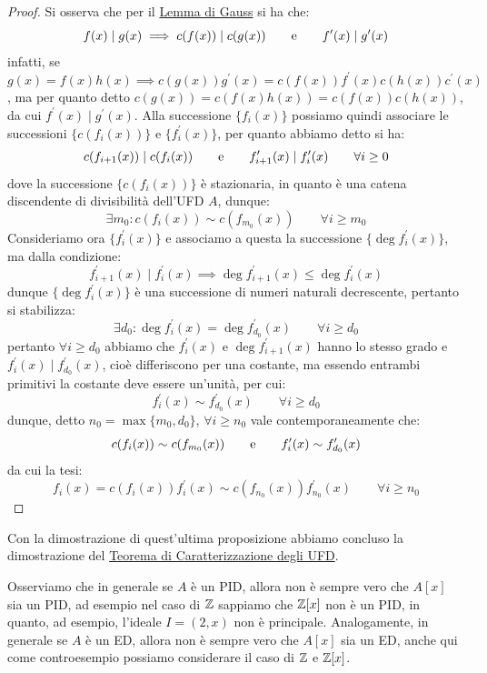 \documentclass[11pt]{scrartcl}
\begin{document}
\begin{proof}
    Si osserva che per il \hyperref[gauss]{Lemma di Gauss} si ha che:
    \[ f(x) \mid g(x) \implies c(f(x)) \mid c(g(x)) \qquad \text e \qquad f^{\prime}(x) \mid g^{\prime}(x)
        \]
    infatti, se $g(x) = f(x) h(x) \implies c(g(x))g^{\prime}(x) = c(f(x))f^{\prime}(x)c(h(x))c^{\prime}(x)$,
    ma per quanto detto $c(g(x)) = c(f(x)h(x)) = c(f(x))c(h(x))$, da cui $f^{\prime}(x) \mid g^{\prime}(x)$.
    Alla successione $\{f_i(x)\}$ possiamo quindi associare le successioni $\{c(f_i(x))\}$ e $\{f_i^{\prime}(x)\}$, per quanto abbiamo detto si ha:
    \[ c(f_{i+1}(x)) \mid c(f_{i}(x)) \qquad \text e \qquad f_{i+1}^{\prime}(x) \mid f_i^{\prime}(x) \qquad \forall i \geq 0
        \]
    dove la successione $\{c(f_i(x))\}$ è stazionaria, in quanto è una catena discendente di divisibilità dell'UFD $A$, dunque:
    \[ \exists m_0 : c(f_i(x)) \sim c(f_{m_0}(x)) \qquad \forall i \geq m_0
        \]
    Consideriamo ora $\{f_i^{\prime}(x)\}$ e associamo a questa la successione $\{\deg f_i^{\prime}(x)\}$, ma dalla condizione:
    \[ f_{i+1}^{\prime}(x) \mid f_i^{\prime}(x) \implies \deg f_{i+1}^{\prime}(x) \leq \deg f_i^{\prime}(x)
        \]
    dunque $\{\deg f_i^{\prime}(x)\}$ è una successione di numeri naturali decrescente, pertanto si stabilizza:
    \[ \exists d_0 : \deg f_{i}^{\prime}(x) = \deg f_{d_0}^{\prime}(x) \qquad \forall i \geq d_0
        \]
    pertanto $\forall i \geq d_0$ abbiamo che $f_i^{\prime}(x)$ e $\deg f_{i+1}^{\prime}(x)$ hanno lo stesso grado e $f_{i}^{\prime}(x) \mid f_{d_0}^{\prime}(x)$,
    cioè differiscono per una costante, ma essendo entrambi primitivi la costante deve essere un'unità, per cui:
    \[ f_{i}^{\prime}(x) \sim f_{d_0}^{\prime}(x) \qquad \forall i \geq d_0
        \]
    dunque, detto $n_0 = \max\{m_0,d_0\}$, $\forall i \geq n_0$ vale contemporaneamente che:
    \[ c(f_i(x)) \sim c(f_{m_0}(x)) \qquad \text e \qquad f_{i}^{\prime}(x) \sim f_{d_0}^{\prime}(x)
        \]
    da cui la tesi:
    \[ f_i(x) = c(f_i(x))f_{i}^{\prime}(x) \sim c(f_{n_0}(x))f_{n_0}^{\prime}(x) \qquad \forall i \geq n_0
        \]
\end{proof}

Con la dimostrazione di quest'ultima proposizione abbiamo concluso la dimostrazione del \hyperref[2.109]{Teorema di Caratterizzazione degli UFD}.

\begin{remark}
    Osserviamo che in generale se $A$ è un PID, allora non è sempre vero che $A[x]$ sia un PID, ad esempio nel caso di $\mathbb Z$ sappiamo che $\mathbb Z[x]$ non è un PID, in quanto,
    ad esempio, l'ideale $I = (2,x)$ non è principale. Analogamente, in generale se $A$ è un ED, allora non è sempre vero che $A[x]$ sia un ED, anche qui come controesempio possiamo 
    considerare il caso di $\mathbb Z$ e $\mathbb Z[x]$.
\end{remark}
\end{document}
